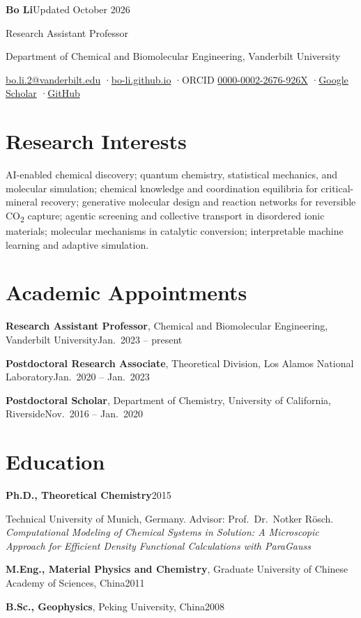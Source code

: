 \documentclass[10pt]{article}
\newcommand{\entry}[3]{%
  \textbf{#1}\hfill{\color{muted}#2}\par
  #3\par\vspace{3pt}}
\newcommand{\row}[3]{\textbf{#1}, #2\hfill{\color{muted}#3}\par\vspace{3pt}}
\newcommand{\co}{CO\textsubscript{2}}
\begin{document}
{\LARGE\textbf{Bo Li}}\hfill{\color{muted}\footnotesize Updated October 2026}\par\vspace{3pt}
Research Assistant Professor\par
Department of Chemical and Biomolecular Engineering, Vanderbilt University\par\vspace{2pt}
{\color{muted}\small
\href{mailto:bo.li.2@vanderbilt.edu}{bo.li.2@vanderbilt.edu}
\enspace·\enspace \href{https://bo-li.github.io}{bo-li.github.io}
\enspace·\enspace ORCID \href{https://orcid.org/0000-0002-2676-926X}{0000-0002-2676-926X}
\enspace·\enspace \href{https://scholar.google.com/citations?user=g8bfBFUAAAAJ}{Google Scholar}
\enspace·\enspace \href{https://github.com/bo-li}{GitHub}\par}

\section{Research Interests}

AI-enabled chemical discovery; quantum chemistry, statistical mechanics, and molecular simulation;
chemical knowledge and coordination equilibria for critical-mineral recovery; generative molecular
design and reaction networks for reversible \co{} capture; agentic screening and collective
transport in disordered ionic materials; molecular mechanisms in catalytic conversion;
interpretable machine learning and adaptive simulation.

\section{Academic Appointments}

\row{Research Assistant Professor}{Chemical and Biomolecular Engineering, Vanderbilt University}
  {Jan.\ 2023 -- present}
\row{Postdoctoral Research Associate}{Theoretical Division, Los Alamos National Laboratory}
  {Jan.\ 2020 -- Jan.\ 2023}
\row{Postdoctoral Scholar}{Department of Chemistry, University of California, Riverside}
  {Nov.\ 2016 -- Jan.\ 2020}

\section{Education}

\entry{Ph.D., Theoretical Chemistry}{2015}
  {Technical University of Munich, Germany. Advisor: Prof.\ Dr.\ Notker Rösch.\\
  \emph{Computational Modeling of Chemical Systems in Solution: A Microscopic Approach for
  Efficient Density Functional Calculations with ParaGauss}}
\row{M.Eng., Material Physics and Chemistry}{Graduate University of Chinese Academy of Sciences, China}
  {2011}
\row{B.Sc., Geophysics}{Peking University, China}{2008}
\end{document}

